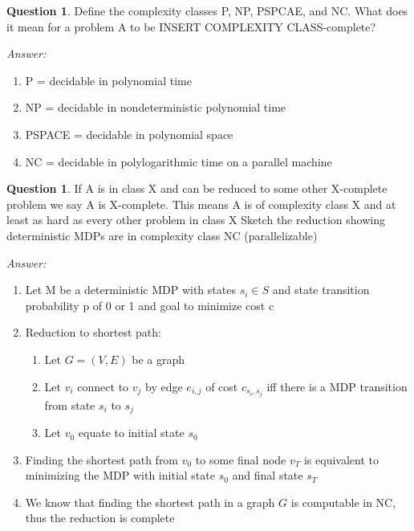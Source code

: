 \documentclass{article}
\theoremstyle{definition}
\newtheorem{question}[thm]{Question}
\newenvironment{answer}{\noindent\textit{Answer:}}{}
\begin{document}
\begin{question}
    Define the complexity classes P, NP, PSPCAE, and NC. What does it mean for a problem A to be INSERT COMPLEXITY CLASS-complete?
\end{question}

\begin{answer}
    \begin{enumerate}
        \item P = decidable in polynomial time
        \item NP = decidable in nondeterministic polynomial time
        \item PSPACE = decidable in polynomial space
        \item NC = decidable in polylogarithmic time on a parallel machine
    \end{enumerate}
\end{answer}

\begin{question}
If A is in class X and can be reduced to some other X-complete problem we say A is X-complete. This means A is of complexity class X and at least as hard as every other problem in class X
Sketch the reduction showing deterministic MDPs are in complexity class NC (parallelizable)
\end{question}

\begin{answer}
    \begin{enumerate}
        \item Let M be a deterministic MDP with states $s_i \in S$ and state transition probability p of 0 or 1 and goal to minimize cost c
        \item Reduction to shortest path:
            \begin{enumerate}
                \item Let $G=(V,E)$ be a graph
                \item Let $v_i$ connect to $v_j$ by edge $e_{i,j}$ of cost $c_{s_i,s_j}$ iff there is a MDP transition from state $s_i$ to $s_j$ 
                \item Let $v_0$ equate to initial state $s_0$ 
            \end{enumerate}
        \item Finding the shortest path from $v_0$ to some final node $v_T$ is equivalent to minimizing the MDP with initial state $s_0$ and final state $s_T$
        \item We know that finding the shortest path in a graph $G$ is computable in NC, thus the reduction is complete
    \end{enumerate}
\end{answer}
\end{document}
